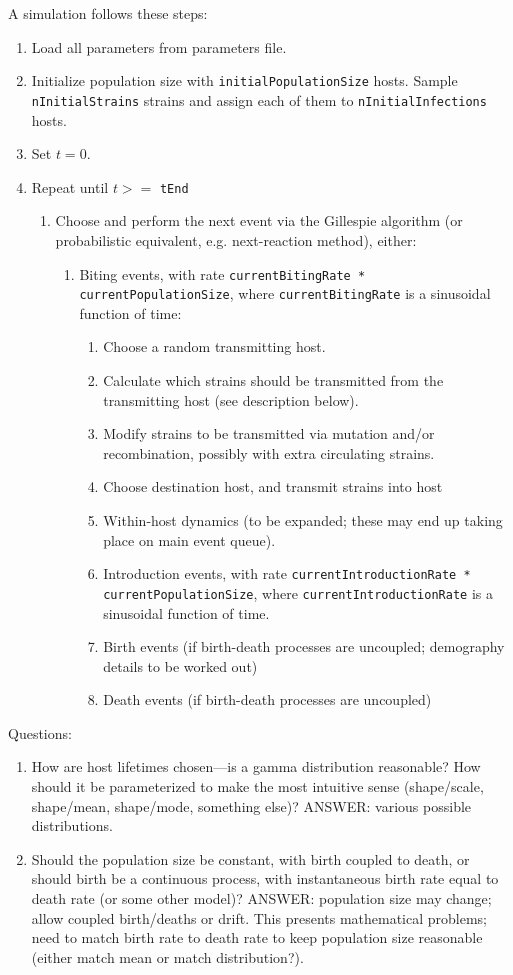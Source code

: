 \documentclass[11pt]{article}
\begin{document}
A simulation follows these steps:
\begin{enumerate}
	\item Load all parameters from parameters file.
	\item Initialize population size with \texttt{initialPopulationSize} hosts. Sample \texttt{nInitialStrains} strains and assign each of them to \texttt{nInitialInfections} hosts.
	\item Set $t = 0$.
	\item Repeat until $t >= $ \texttt{tEnd}
	\begin{enumerate}
		\item Choose and perform the next event via the Gillespie algorithm (or probabilistic equivalent, e.g. next-reaction method), either:
		\begin{enumerate}
			\item Biting events, with rate \texttt{currentBitingRate * currentPopulationSize}, where \texttt{currentBitingRate} is a sinusoidal function of time:
			\begin{enumerate}
				\item Choose a random transmitting host.
				\item Calculate which strains should be transmitted from the transmitting host (see description below).
				\item Modify strains to be transmitted via mutation and/or recombination, possibly with extra circulating strains.
				\item Choose destination host, and transmit strains into host
				\item Within-host dynamics (to be expanded; these may end up taking place on main event queue).
			\item Introduction events, with rate \texttt{currentIntroductionRate * currentPopulationSize}, where \texttt{currentIntroductionRate} is a sinusoidal function of time.
			\item Birth events (if birth-death processes are uncoupled; demography details to be worked out)
			\item Death events (if birth-death processes are uncoupled)
			\end{enumerate}
		\end{enumerate}
	\end{enumerate}
\end{enumerate}

Questions:
\begin{enumerate}
	\item How are host lifetimes chosen---is a gamma distribution reasonable? How should it be parameterized to make the most intuitive sense (shape/scale, shape/mean, shape/mode, something else)? ANSWER: various possible distributions.
	\item Should the population size be constant, with birth coupled to death, or should birth be a continuous process, with instantaneous birth rate equal to death rate (or some other model)? ANSWER: population size may change; allow coupled birth/deaths or drift. This presents mathematical problems; need to match birth rate to death rate to keep population size reasonable (either match mean or match distribution?).
\end{enumerate}
\end{document}
